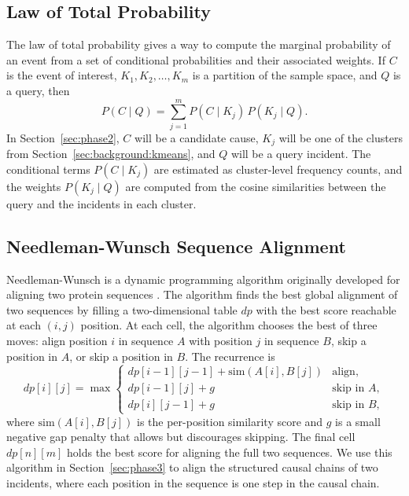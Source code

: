 \documentclass[11pt]{article}
\begin{document}
\subsection{Law of Total Probability}
\label{sec:background:lotp}

The law of total probability gives a way to compute the marginal probability of an event from a set of conditional probabilities and their associated weights. If $C$ is the event of interest, $K_1, K_2, \ldots, K_m$ is a partition of the sample space, and $Q$ is a query, then
\begin{equation}
P(C \mid Q) = \sum_{j=1}^{m} P(C \mid K_j) \, P(K_j \mid Q).
\label{eq:lotp}
\end{equation}
In Section~\ref{sec:phase2}, $C$ will be a candidate cause, $K_j$ will be one of the clusters from Section~\ref{sec:background:kmeans}, and $Q$ will be a query incident. The conditional terms $P(C \mid K_j)$ are estimated as cluster-level frequency counts, and the weights $P(K_j \mid Q)$ are computed from the cosine similarities between the query and the incidents in each cluster.

\subsection{Needleman-Wunsch Sequence Alignment}
\label{sec:background:nw}

Needleman-Wunsch is a dynamic programming algorithm originally developed for aligning two protein sequences \citep{NeedlemanWunsch1970}. The algorithm finds the best global alignment of two sequences by filling a two-dimensional table $dp$ with the best score reachable at each $(i, j)$ position. At each cell, the algorithm chooses the best of three moves: align position $i$ in sequence $A$ with position $j$ in sequence $B$, skip a position in $A$, or skip a position in $B$. The recurrence is
\begin{equation}
dp[i][j] = \max
\begin{cases}
dp[i-1][j-1] + \text{sim}(A[i], B[j]) & \text{align}, \\
dp[i-1][j] + g & \text{skip in } A, \\
dp[i][j-1] + g & \text{skip in } B,
\end{cases}
\label{eq:nw}
\end{equation}
where $\text{sim}(A[i], B[j])$ is the per-position similarity score and $g$ is a small negative gap penalty that allows but discourages skipping. The final cell $dp[n][m]$ holds the best score for aligning the full two sequences. We use this algorithm in Section~\ref{sec:phase3} to align the structured causal chains of two incidents, where each position in the sequence is one step in the causal chain.
\end{document}
